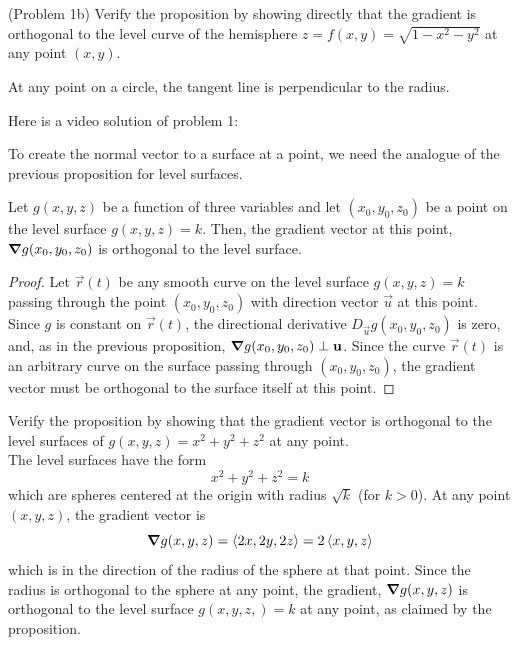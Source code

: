 \documentclass[handout]{ximera}
\begin{document}
\begin{problem}(Problem 1b)
Verify the proposition by showing directly that the gradient is orthogonal 
to the level curve  of the hemisphere $z = f(x,y) = \sqrt{1 - x^2 - y^2}$ at any point $(x,y)$.
\begin{hint}
At any point on a circle, the tangent line is perpendicular to the radius.
\end{hint}
\end{problem}

Here is a video solution of problem 1:\\
\begin{foldable}
\end{foldable}

To create the normal vector to a surface at a point, we need the analogue of 
the previous proposition for level surfaces.

\begin{proposition}
Let $g(x,y,z)$ be a function of three variables and let $(x_0, y_0, z_0)$ be 
a point on the level surface $g(x,y, z) = k$.
Then, the gradient vector at this point, $\boldsymbol\nabla g(x_0, y_0, z_0)$ is orthogonal 
to the level surface.
\end{proposition}
\begin{proof}
Let $\vec r(t)$ be any smooth curve on the level surface $g(x,y, z) = k$ passing 
through the point $(x_0, y_0, z_0)$ with direction vector $\vec u$ at this point.
Since $g$ is constant on $\vec r(t)$, the directional 
derivative $D_{\vec u} g(x_0, y_0, z_0)$ is zero, and, as in the previous proposition, 
$\boldsymbol\nabla g(x_0, y_0, z_0) \perp \mathbf u$.  
Since the curve $\vec r(t)$ is an arbitrary curve on the surface 
passing through $(x_0, y_0, z_0)$, the gradient vector must be 
orthogonal to the surface itself at this point.
\end{proof}

\begin{example}[Example 2]
Verify the proposition by showing that the gradient vector is orthogonal 
to the level surfaces of $g(x, y, z) = x^2 + y^2 + z^2$ at any point.\\
The level surfaces have the form
\[
x^2 + y^2 + z^2 = k
\]
which are spheres centered at the origin with radius $\sqrt k$ (for $k>0$).
At any point $(x, y, z)$, the gradient vector is
\[
\boldsymbol\nabla g(x, y, z) = \left\langle 2x, 2y, 2z\right\rangle = 2\left\langle x, y, z\right\rangle
\]
which is in the direction of the radius of the sphere at that point. 
Since the radius is orthogonal to the sphere at any point,
the gradient, $\boldsymbol\nabla g(x,y,z)$ is orthogonal to the level 
surface $g(x, y, z,) = k$ at any point, as claimed by the proposition.
\end{example}
\end{document}
